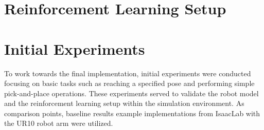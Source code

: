 
\section{Reinforcement Learning Setup}\label{sec:rl_setup}




\section{Initial Experiments} %

To work towards the final implementation, initial experiments were conducted focusing on basic tasks such as reaching a specified pose and performing simple pick-and-place operations. 
These experiments served to validate the robot model and the reinforcement learning setup within the simulation environment.
As comparison points, baseline results example implementations from IsaacLab with the UR10 robot arm were utilized.

